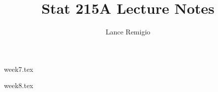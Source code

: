 \documentclass[a4paper]{article}
\title{Stat 215A Lecture Notes}
\author{Lance Remigio}
\begin{document}
\maketitle

{week7.tex}

{week8.tex}
\end{document}

